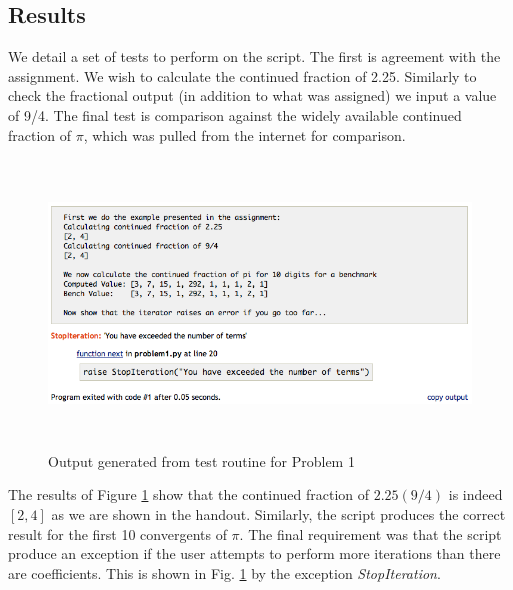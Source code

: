 \subsection{Results} %
\label{sub:results}
We detail a set of tests to perform on the script. The first is agreement with the assignment. We wish to calculate the continued fraction of 2.25. Similarly to check the fractional output (in addition to what was assigned) we input a value of 9/4. The final test is comparison against the widely available continued fraction of $\pi$, which was pulled from the internet for comparison.

\begin{figure}[H]
    \centering
        \includegraphics[height=3in]{include/prob1test.png}
    \caption{Output generated from test routine for Problem 1}
    \label{fig:include_prob1test}
\end{figure}\noindent
The results of Figure \ref{fig:include_prob1test} show that the continued fraction of $2.25 (9/4)$ is indeed $[2,4]$ as we are shown in the handout. Similarly, the script produces the correct result for the first 10 convergents of $\pi$.
The final requirement was that the script produce an exception if the user attempts to perform more iterations than there are coefficients. This is shown in Fig. \ref{fig:include_prob1test} by the exception \emph{StopIteration}.
